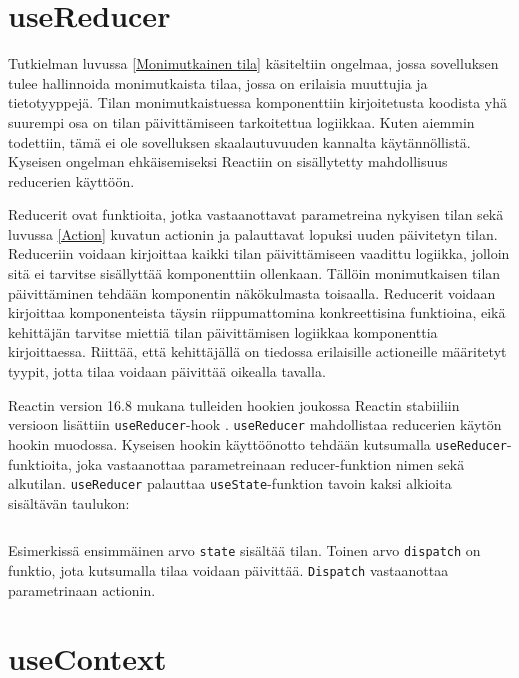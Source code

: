 
\section{useReducer}
\label{useReducer}

Tutkielman luvussa \ref{Monimutkainen tila} käsiteltiin ongelmaa, jossa sovelluksen tulee hallinnoida monimutkaista tilaa, jossa on erilaisia muuttujia ja tietotyyppejä. Tilan monimutkaistuessa komponenttiin kirjoitetusta koodista yhä suurempi osa on tilan päivittämiseen tarkoitettua logiikkaa. Kuten aiemmin todettiin, tämä ei ole sovelluksen skaalautuvuuden kannalta käytännöllistä. Kyseisen ongelman ehkäisemiseksi Reactiin on sisällytetty mahdollisuus reducerien käyttöön.

Reducerit ovat funktioita, jotka vastaanottavat parametreina nykyisen tilan sekä luvussa \ref{Action} kuvatun actionin ja palauttavat lopuksi uuden päivitetyn tilan. Reduceriin voidaan kirjoittaa kaikki tilan päivittämiseen vaadittu logiikka, jolloin sitä ei tarvitse sisällyttää komponenttiin ollenkaan. Tällöin monimutkaisen tilan päivittäminen tehdään komponentin näkökulmasta toisaalla. Reducerit voidaan kirjoittaa komponenteista täysin riippumattomina konkreettisina funktioina, eikä kehittäjän tarvitse miettiä tilan päivittämisen logiikkaa komponenttia kirjoittaessa. Riittää, että kehittäjällä on tiedossa erilaisille actioneille määritetyt tyypit, jotta tilaa voidaan päivittää oikealla tavalla. \cite{reducer}

Reactin version 16.8 mukana tulleiden hookien joukossa Reactin stabiiliin versioon lisättiin \texttt{useReducer}-hook \cite{reactdocshooksapi}. \texttt{useReducer} mahdollistaa reducerien käytön hookin muodossa. Kyseisen hookin käyttöönotto tehdään kutsumalla \texttt{useReducer}-funktioita, joka vastaanottaa parametreinaan reducer-funktion nimen sekä alkutilan. \texttt{useReducer} palauttaa \texttt{useState}-funktion tavoin kaksi alkioita sisältävän taulukon:
\inputminted[bgcolor=black,highlightlines={13},highlightcolor=darkgray]{jsx.py:JsxLexer -x}{listaukset/usereducer.js}
Esimerkissä ensimmäinen arvo \texttt{state} sisältää tilan. Toinen arvo \texttt{dispatch} on funktio, jota kutsumalla tilaa voidaan päivittää. \texttt{Dispatch} vastaanottaa parametrinaan actionin.


\section{useContext}
\label{useContext}

